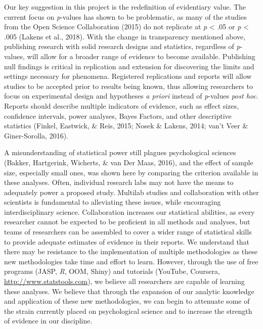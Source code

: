 \documentclass[,man, mask]{apa6}
\theoremstyle{definition}
\theoremstyle{definition}
\theoremstyle{definition}
\theoremstyle{remark}
\begin{document}
Our key suggestion in this project is the redefinition of evidentiary
value. The current focus on \emph{p}-values has shown to be problematic,
as many of the studies from the Open Science Collaboration (2015) do not
replicate at \emph{p} \textless{} .05 or \emph{p} \textless{} .005
(Lakens et al., 2018). With the change in transparency mentioned above,
publishing research with solid research designs and statistics,
regardless of \emph{p}-values, will allow for a broader range of
evidence to become available. Publishing null findings is critical in
replication and extension for discovering the limits and settings
necessary for phenomena. Registered replications and reports will allow
studies to be accepted prior to results being known, thus allowing
researchers to focus on experimental design and hypotheses \emph{a
priori} instead of \emph{p}-values \emph{post hoc}. Reports should
describe multiple indicators of evidence, such as effect sizes,
confidence intervals, power analyses, Bayes Factors, and other
descriptive statistics (Finkel, Eastwick, \& Reis, 2015; Nosek \&
Lakens, 2014; van't Veer \& Giner-Sorolla, 2016).

A misunderstanding of statistical power still plagues psychological
sciences (Bakker, Hartgerink, Wicherts, \& van Der Maas, 2016), and the
effect of sample size, especially small ones, was shown here by
comparing the criterion available in these analyses. Often, individual
research labs may not have the means to adequately power a proposed
study. Multilab studies and collaboration with other scientists is
fundamental to alleviating these issues, while encouraging
interdisciplinary science. Collaboration increases our statistical
abilities, as every researcher cannot be expected to be proficient in
all methods and analyses, but teams of researchers can be assembled to
cover a wider range of statistical skills to provide adequate estimates
of evidence in their reports. We understand that there may be resistance
to the implementation of multiple methodologies as these new
methodologies take time and effort to learn. However, through the use of
free programs (JASP, \emph{R}, OOM, Shiny) and tutorials (YouTube,
Coursera, \url{http://www.statstools.com}), we believe all researchers
are capable of learning these analyses. We believe that through the
expansion of our analytic knowledge and application of these new
methodologies, we can begin to attenuate some of the strain currently
placed on psychological science and to increase the strength of evidence
in our discipline.
\end{document}
